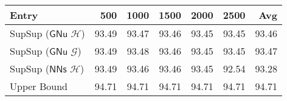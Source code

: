 \begin{tabular}{lrrrrrr}
\toprule
                                              Entry &   500 &  1000 &  1500 &  2000 &  2500 &   Avg \\
\midrule
 SupSup ($\ensuremath{\mathsf{GNu}}$ $\mathcal{H}$) & 93.49 & 93.47 & 93.46 & 93.45 & 93.45 & 93.46 \\
 SupSup ($\ensuremath{\mathsf{GNu}}$ $\mathcal{G}$) & 93.49 & 93.48 & 93.46 & 93.45 & 93.45 & 93.47 \\
 SupSup ($\ensuremath{\mathsf{NNs}}$ $\mathcal{H}$) & 93.49 & 93.46 & 93.46 & 93.45 & 92.54 & 93.28 \\\midrule
                                        Upper Bound & 94.71 & 94.71 & 94.71 & 94.71 & 94.71 & 94.71 \\
\bottomrule
\end{tabular}
